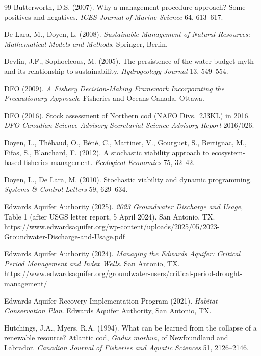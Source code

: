 \begin{thebibliography}{99}
 Butterworth, D.S. (2007). Why a management procedure approach? Some positives and negatives. \emph{ICES Journal of Marine Science} 64, 613--617.

 De Lara, M., Doyen, L. (2008). \emph{Sustainable Management of Natural Resources: Mathematical Models and Methods}. Springer, Berlin.

 Devlin, J.F., Sophocleous, M. (2005). The persistence of the water budget myth and its relationship to sustainability. \emph{Hydrogeology Journal} 13, 549--554.

 DFO (2009). \emph{A Fishery Decision-Making Framework Incorporating the Precautionary Approach}. Fisheries and Oceans Canada, Ottawa.

 DFO (2016). Stock assessment of Northern cod (NAFO Divs.\ 2J3KL) in 2016. \emph{DFO Canadian Science Advisory Secretariat Science Advisory Report} 2016/026.

 Doyen, L., Th\'ebaud, O., B\'en\'e, C., Martinet, V., Gourguet, S., Bertignac, M., Fifas, S., Blanchard, F. (2012). A stochastic viability approach to ecosystem-based fisheries management. \emph{Ecological Economics} 75, 32--42.

 Doyen, L., De Lara, M. (2010). Stochastic viability and dynamic programming. \emph{Systems \& Control Letters} 59, 629--634.

 Edwards Aquifer Authority (2025). \emph{2023 Groundwater Discharge and Usage}, Table 1 (after USGS letter report, 5 April 2024). San Antonio, TX. \url{https://www.edwardsaquifer.org/wp-content/uploads/2025/05/2023-Groundwater-Discharge-and-Usage.pdf}

 Edwards Aquifer Authority (2024). \emph{Managing the Edwards Aquifer: Critical Period Management and Index Wells}. San Antonio, TX. \url{https://www.edwardsaquifer.org/groundwater-users/critical-period-drought-management/}

 Edwards Aquifer Recovery Implementation Program (2021). \emph{Habitat Conservation Plan}. Edwards Aquifer Authority, San Antonio, TX.

 Hutchings, J.A., Myers, R.A. (1994). What can be learned from the collapse of a renewable resource? Atlantic cod, \emph{Gadus morhua}, of Newfoundland and Labrador. \emph{Canadian Journal of Fisheries and Aquatic Sciences} 51, 2126--2146.


\end{thebibliography}
